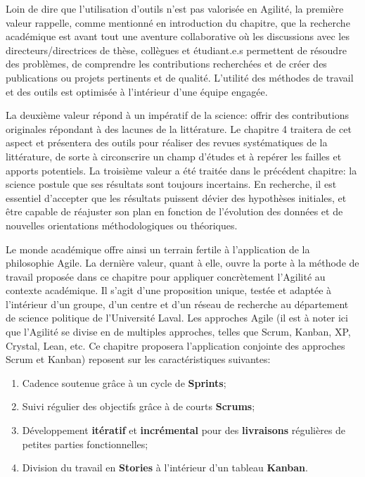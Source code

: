 \documentclass[
  letterpaper,
  DIV=11,
  numbers=noendperiod]{scrreprt}
\providecommand{\tightlist}{%
  \setlength{\itemsep}{0pt}\setlength{\parskip}{0pt}}\usepackage{longtable,booktabs,array}
\begin{document}
Loin de dire que l'utilisation d'outils n'est pas valorisée en Agilité,
la première valeur rappelle, comme mentionné en introduction du
chapitre, que la recherche académique est avant tout une aventure
collaborative où les discussions avec les directeurs/directrices de
thèse, collègues et étudiant.e.s permettent de résoudre des problèmes,
de comprendre les contributions recherchées et de créer des publications
ou projets pertinents et de qualité. L'utilité des méthodes de travail
et des outils est optimisée à l'intérieur d'une équipe engagée.

La deuxième valeur répond à un impératif de la science: offrir des
contributions originales répondant à des lacunes de la littérature. Le
chapitre 4 traitera de cet aspect et présentera des outils pour réaliser
des revues systématiques de la littérature, de sorte à circonscrire un
champ d'études et à repérer les failles et apports potentiels. La
troisième valeur a été traitée dans le précédent chapitre: la science
postule que ses résultats sont toujours incertains. En recherche, il est
essentiel d'accepter que les résultats puissent dévier des hypothèses
initiales, et être capable de réajuster son plan en fonction de
l'évolution des données et de nouvelles orientations méthodologiques ou
théoriques.

Le monde académique offre ainsi un terrain fertile à l'application de la
philosophie Agile. La dernière valeur, quant à elle, ouvre la porte à la
méthode de travail proposée dans ce chapitre pour appliquer concrètement
l'Agilité au contexte académique. Il s'agit d'une proposition unique,
testée et adaptée à l'intérieur d'un groupe, d'un centre et d'un réseau
de recherche au département de science politique de l'Université Laval.
Les approches Agile (il est à noter ici que l'Agilité se divise en de
multiples approches, telles que Scrum, Kanban, XP, Crystal, Lean, etc.
Ce chapitre proposera l'application conjointe des approches Scrum et
Kanban) reposent sur les caractéristiques suivantes:

\begin{enumerate}
\def\labelenumi{\arabic{enumi}.}
\tightlist
\item
  Cadence soutenue grâce à un cycle de \textbf{Sprints};
\item
  Suivi régulier des objectifs grâce à de courts \textbf{Scrums};
\item
  Développement \textbf{itératif} et \textbf{incrémental} pour des
  \textbf{livraisons} régulières de petites parties fonctionnelles;
\item
  Division du travail en \textbf{Stories} à l'intérieur d'un tableau
  \textbf{Kanban}.
\end{enumerate}
\end{document}
